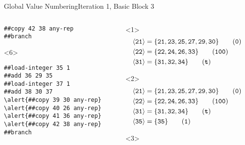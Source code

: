 \documentclass{beamer}
\newcommand{\vn}[1]{\ensuremath{\langle\texttt{#1}\rangle}}
\newcommand{\vreg}[1]{\texttt{#1}}
\begin{document}
\begin{frame}[fragile]{Global Value Numbering}{Iteration 1, Basic Block 3}
\begin{columns}[t,onlytextwidth]
\begin{column}[t]{.5\textwidth}
\begin{onlyenv}
\begin{Verbatim}[frame=single,commandchars=\\\{\}]
##copy 42 38 any-rep
##branch
        \end{Verbatim}
      \end{onlyenv}
      \begin{onlyenv}<6>
        \begin{Verbatim}[frame=single,commandchars=\\\{\}]
##load-integer 35 1
##add 36 29 35
##load-integer 37 1
##add 38 30 37
\alert{##copy 39 30 any-rep}
\alert{##copy 40 26 any-rep}
\alert{##copy 41 36 any-rep}
\alert{##copy 42 38 any-rep}
##branch
        \end{Verbatim}
      \end{onlyenv}
    \end{column}
    \begin{column}{.5\textwidth}
      \begin{onlyenv}<1>
        \begin{align*}
          \vn{21} &= \{\vreg{21},
                       \vreg{23},
                       \vreg{25},
                       \vreg{27},
                       \vreg{29},
                       \vreg{30}\} \tag{\texttt{0}} \\
          \vn{22} &= \{\vreg{22},
                       \vreg{24},
                       \vreg{26},
                       \vreg{33}\} \tag{\texttt{100}} \\
          \vn{31} &= \{\vreg{31},
                       \vreg{32},
                       \vreg{34}\} \tag{\texttt{\textbf{t}}}
        \end{align*}
      \end{onlyenv}
      \begin{onlyenv}<2>
        \begin{align*}
          \vn{21} &= \{\vreg{21},
                       \vreg{23},
                       \vreg{25},
                       \vreg{27},
                       \vreg{29},
                       \vreg{30}\} \tag{\texttt{0}} \\
          \vn{22} &= \{\vreg{22},
                       \vreg{24},
                       \vreg{26},
                       \vreg{33}\} \tag{\texttt{100}} \\
          \vn{31} &= \{\vreg{31},
                       \vreg{32},
                       \vreg{34}\} \tag{\texttt{\textbf{t}}} \\
          \vn{35} &= \{\vreg{35}\} \tag{\texttt{1}}
        \end{align*}
      \end{onlyenv}
      \begin{onlyenv}<3>

\end{onlyenv}
\end{column}
\end{columns}
\end{frame}
\end{document}
